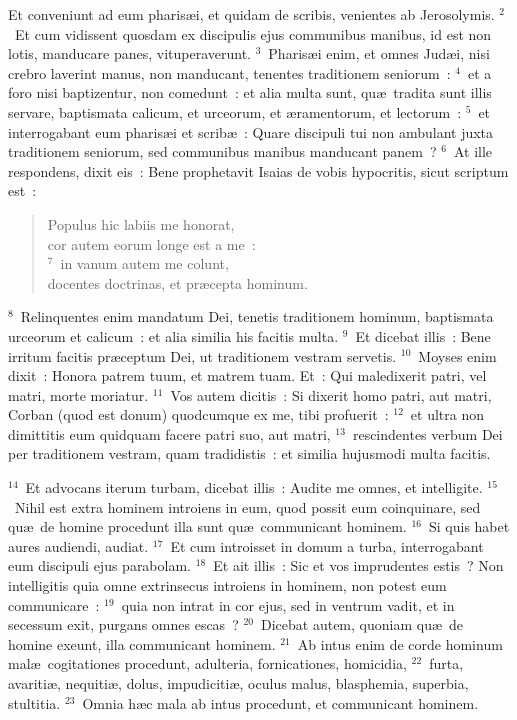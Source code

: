 \lettrine[lines=3,image=true,loversize=0.05,lraise=-0.03]{E}{}t conveniunt ad eum pharis\ae i, et quidam de scribis, venientes ab Jerosolymis.
${}^{2}$~Et cum vidissent quosdam ex discipulis ejus communibus manibus, id est non lotis, manducare panes, vituperaverunt.
${}^{3}$~Pharis\ae i enim, et omnes Jud\ae i, nisi crebro laverint manus, non manducant, tenentes traditionem seniorum~:
${}^{4}$~et a foro nisi baptizentur, non comedunt~: et alia multa sunt, qu\ae\ tradita sunt illis servare, baptismata calicum, et urceorum, et \ae ramentorum, et lectorum~:
${}^{5}$~et interrogabant eum pharis\ae i et scrib\ae~: Quare discipuli tui non ambulant juxta traditionem seniorum, sed communibus manibus manducant panem~?
${}^{6}$~At ille respondens, dixit eis~: Bene prophetavit Isaias de vobis hypocritis, sicut scriptum est~: \begin{flushleft}\begin{verse}Populus hic labiis me honorat,\\ cor autem eorum longe est a me~:\\
${}^{7}$~in vanum autem me colunt,\\ docentes doctrinas, et pr\ae cepta hominum.\end{verse}\end{flushleft}


${}^{8}$~Relinquentes enim mandatum Dei, tenetis traditionem hominum, baptismata urceorum et calicum~: et alia similia his facitis multa.
${}^{9}$~Et dicebat illis~: Bene irritum facitis pr\ae ceptum Dei, ut traditionem vestram servetis.
${}^{10}$~Moyses enim dixit~: Honora patrem tuum, et matrem tuam. Et~: Qui maledixerit patri, vel matri, morte moriatur.
${}^{11}$~Vos autem dicitis~: Si dixerit homo patri, aut matri, Corban (quod est donum) quodcumque ex me, tibi profuerit~:
${}^{12}$~et ultra non dimittitis eum quidquam facere patri suo, aut matri,
${}^{13}$~rescindentes verbum Dei per traditionem vestram, quam tradidistis~: et similia hujusmodi multa facitis.


${}^{14}$~Et advocans iterum turbam, dicebat illis~: Audite me omnes, et intelligite.
${}^{15}$~Nihil est extra hominem introiens in eum, quod possit eum coinquinare, sed qu\ae\ de homine procedunt illa sunt qu\ae\ communicant hominem.
${}^{16}$~Si quis habet aures audiendi, audiat.
${}^{17}$~Et cum introisset in domum a turba, interrogabant eum discipuli ejus parabolam.
${}^{18}$~Et ait illis~: Sic et vos imprudentes estis~? Non intelligitis quia omne extrinsecus introiens in hominem, non potest eum communicare~:
${}^{19}$~quia non intrat in cor ejus, sed in ventrum vadit, et in secessum exit, purgans omnes escas~?
${}^{20}$~Dicebat autem, quoniam qu\ae\ de homine exeunt, illa communicant hominem.
${}^{21}$~Ab intus enim de corde hominum mal\ae\ cogitationes procedunt, adulteria, fornicationes, homicidia,
${}^{22}$~furta, avariti\ae , nequiti\ae , dolus, impudiciti\ae , oculus malus, blasphemia, superbia, stultitia.
${}^{23}$~Omnia h\ae c mala ab intus procedunt, et communicant hominem.


